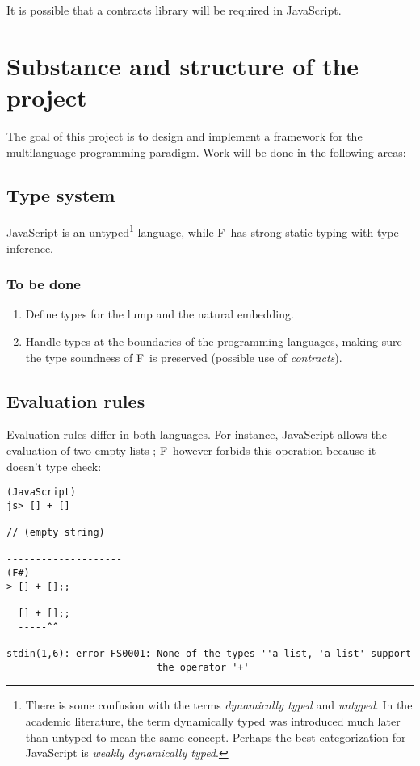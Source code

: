 \documentclass[12pt,a4paper, twoside]{article}
\newcommand{\fs}{F\nolinebreak\hspace{-.05em}\raisebox{.6ex}{\tiny\bf
    \#}}
\begin{document}
It is possible that a contracts library will be required in JavaScript. 

\section{Substance and structure of the project}

The goal of this project is to design and implement a framework for
the multilanguage programming paradigm. Work will be done in the
following areas:

\subsection{Type system}
JavaScript is an untyped\footnote{There is
some confusion with the terms \emph{dynamically typed} and
\emph{untyped}. In the academic literature, the term dynamically typed
was introduced much later than untyped to mean the same
concept. Perhaps the best categorization for JavaScript is
\emph{weakly dynamically typed}.}  language, while \fs\ has strong
static typing with type inference.

\subsubsection*{To be done}
\begin{enumerate}
\item Define types for the lump and the natural embedding.
\item Handle types at the boundaries of the programming languages,
making sure the type soundness of \fs\ is preserved (possible use of
\emph{contracts}).
\end{enumerate}

\subsection{Evaluation rules}
Evaluation rules differ in both
languages. For instance, JavaScript allows the evaluation of two empty
lists \cite{ECMA-262}; \fs\ however forbids this operation because it
doesn't type check:
\begin{verbatim}
(JavaScript)
js> [] + []

// (empty string)

--------------------
(F#)
> [] + [];;

  [] + [];;
  -----^^

stdin(1,6): error FS0001: None of the types ''a list, 'a list' support
                          the operator '+'
\end{verbatim}
\end{document}
